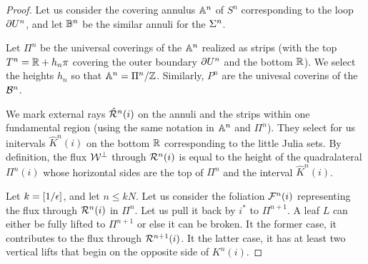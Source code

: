 {{\begin{proof}

Let us consider the covering annulus ${\Bbb A}^n$ of $S^n$ corresponding to the loop
$\partial U^n $, and let ${\Bbb B}^n $ be the similar annuli for the ${\Sigma}^n $.

Let  $\Pi^n$ be the universal coverings of the ${\Bbb A}^n$  realized as strips
(with the top $T^n  ={\Bbb R}+ h_n \pi $  covering the outer boundary $\partial U^n$ and the
bottom ${\Bbb R}$).  We  select the heights $h_n$ so that ${\Bbb A}^n= \Pi^n/{\Bbb Z}$. 
Similarly, $P^n$ are the univesal coverins of the ${\mathcal B}^n $. 

We mark external rays  $\hat {{\mathcal R}}^n(i)$  on the annuli
and the strips within one fundamental region
(using the same notation in ${\Bbb A}^n$ and $\Pi^n$). 
They select for us  initervals $\hat K^n(i)$ on the bottom ${\Bbb R}$ corresponding to the little Julia
sets. By definition, the flux ${\mathcal W}^\perp$ through ${\mathcal R}^n(i)$ is
equal to the height of 
the quadralateral $\Pi^n(i)$ whose horizontal sides are
the top of $\Pi^n$  and the interval $\hat K^n(i)$. 



Let $k=[1/{\epsilon}]$, and let $n\leq kN$. 
Let us consider the foliation ${\mathcal F}^n (i)$ representing the flux
through ${\mathcal R}^n (i)$ in $\Pi^n $. 
Let us pull it back by $i^*$ to $\Pi^{n+1}$.  
A leaf $L$ can either be fully lifted to $\Pi^{n+1}$ or else it can be broken.
 It the former case,  it contributes to the flux through ${\mathcal R}^{n+1}(i)$.
It the latter case, it has at least  two vertical lifts that begin on
the opposite side of $K^n(i)$.  


\end{proof}}}
